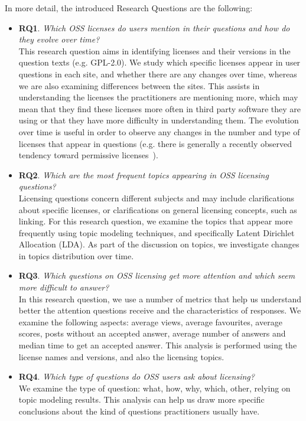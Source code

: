 \documentclass{elsarticle}
\begin{document}
In more detail, the introduced Research Questions are the following:
\begin{itemize}
    \item \textbf{RQ1}. \emph{Which OSS licenses do users mention in their questions and how do they evolve over time?}\\
    This research question aims in identifying licenses and their versions in the question texts (e.g. GPL-2.0). We study which specific licenses appear in user questions in each site, and whether there are any changes over time, whereas we are also examining differences between the sites. This assists in understanding the licenses the practitioners are mentioning more, which may mean that they find these licenses more often in third party software they are using or that they have more difficulty in understanding them. The evolution over time is useful in order to observe any changes in the number and type of licenses that appear in questions (e.g. there is generally a recently observed tendency toward permissive licenses~\cite{vendome2017license}).
    \item \textbf{RQ2}. \emph{Which are the most frequent topics appearing in OSS licensing questions?} \\
    Licensing questions concern different subjects and may include clarifications about specific licenses, or clarifications on general licensing concepts, such as linking. For this research question, we examine the topics that appear more frequently using topic modeling techniques, and specifically Latent Dirichlet Allocation (LDA). As part of the discussion on topics, we investigate changes in topics distribution over time.
    \item \textbf{RQ3}. \emph{Which questions on OSS licensing get more attention and which seem more difficult to answer?}\\
    In this research question, we use a number of metrics that help us understand better the attention questions receive and the characteristics of responses. We examine the following aspects: average views, average favourites, average scores, posts without an accepted answer, average number of answers and median time to get an accepted answer. This analysis is performed using the license names and versions, and also the licensing topics. 
    \item \textbf{RQ4}. \emph{Which type of questions do OSS users ask about licensing?}\\
    We examine the type of question: what, how, why, which, other, relying on topic modeling results. This analysis can help us draw more specific conclusions about the kind of questions practitioners usually have. 
\end{itemize}
\end{document}
